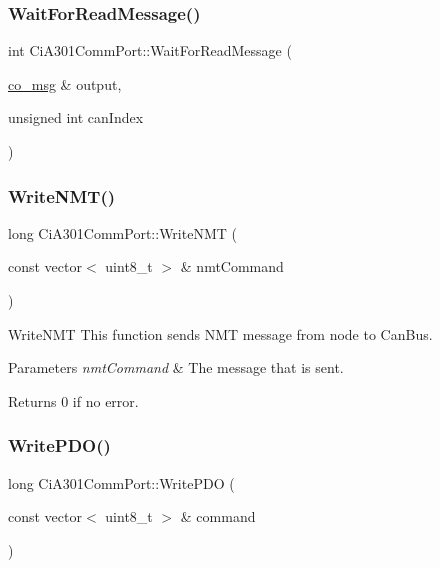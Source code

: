 \subsubsection{\texorpdfstring{Wait\+For\+Read\+Message()}{WaitForReadMessage()}}
{\footnotesize\ttfamily int Ci\+A301\+Comm\+Port\+::\+Wait\+For\+Read\+Message (\begin{DoxyParamCaption}\item[{\hyperlink{structco__msg}{co\+\_\+msg} \&}]{output,  }\item[{unsigned int}]{can\+Index }\end{DoxyParamCaption})\hspace{0.3cm}{\ttfamily [private]}}

\mbox{\label{classCiA301CommPort_a09feb3f78831c9fbb683a85cc3bc4562}} 
\subsubsection{\texorpdfstring{Write\+N\+M\+T()}{WriteNMT()}}
{\footnotesize\ttfamily long Ci\+A301\+Comm\+Port\+::\+Write\+N\+MT (\begin{DoxyParamCaption}\item[{const vector$<$ uint8\+\_\+t $>$ \&}]{nmt\+Command }\end{DoxyParamCaption})}



Write\+N\+MT This function sends N\+MT message from node to Can\+Bus. 


\begin{DoxyParams}{Parameters}
{\em nmt\+Command} & The message that is sent. \\
\hline
\end{DoxyParams}
\begin{DoxyReturn}{Returns}
0 if no error. 
\end{DoxyReturn}
\mbox{\label{classCiA301CommPort_a56d2c604b11363e6b287f59b68a546bd}} 
\subsubsection{\texorpdfstring{Write\+P\+D\+O()}{WritePDO()}}
{\footnotesize\ttfamily long Ci\+A301\+Comm\+Port\+::\+Write\+P\+DO (\begin{DoxyParamCaption}\item[{const vector$<$ uint8\+\_\+t $>$ \&}]{command }\end{DoxyParamCaption})}




